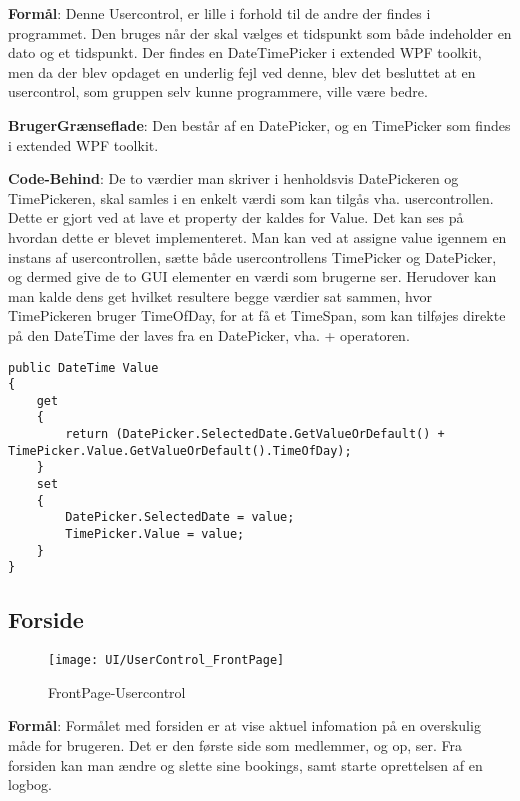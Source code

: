 \textbf{Formål}: Denne Usercontrol, er lille i forhold til de andre der findes i programmet.
Den bruges når der skal vælges et tidspunkt som både indeholder en dato og et tidspunkt. 
Der findes en DateTimePicker i extended WPF toolkit, men da der blev opdaget en underlig fejl ved denne, blev det besluttet at en usercontrol, som gruppen selv kunne programmere, ville være bedre. 

\textbf{BrugerGrænseflade}: Den består af en DatePicker, og en TimePicker som findes i extended WPF toolkit.

\textbf{Code-Behind}: De to værdier man skriver i henholdsvis DatePickeren og TimePickeren, skal samles i en enkelt værdi som kan tilgås vha. usercontrollen. 
Dette er gjort ved at lave et property der kaldes for Value. 
Det kan ses på  hvordan dette er blevet implementeret.
Man kan ved at assigne value igennem en instans af usercontrollen, sætte både usercontrollens TimePicker og DatePicker, og dermed give de to GUI elementer en værdi som brugerne ser.
Herudover kan man kalde dens get hvilket resultere begge værdier sat sammen, hvor TimePickeren bruger TimeOfDay, for at få et TimeSpan, som kan tilføjes direkte på den DateTime der laves fra en DatePicker, vha. + operatoren.

\begin{lstlisting}[frame=single, caption=DateTimePicker Value, label=DateTimePickerValue]
public DateTime Value
{
    get
    {
        return (DatePicker.SelectedDate.GetValueOrDefault() + TimePicker.Value.GetValueOrDefault().TimeOfDay);
    }
    set
    {
        DatePicker.SelectedDate = value;
        TimePicker.Value = value;
    }
}
\end{lstlisting}

\subsection{Forside}
\begin{figure}
    \label{img:frontpage}
    \vspace{-10pt}
    \begin{center}
        \texttt{[image: UI/UserControl\_FrontPage]}
    \end{center}
    \vspace{-15pt}
    \caption{FrontPage-Usercontrol}
\end{figure}

\textbf{Formål}: 
Formålet med forsiden er at vise aktuel infomation på en overskulig måde for brugeren.
Det er den første side som medlemmer, og op, ser.
Fra forsiden kan man ændre og slette sine bookings, samt starte oprettelsen af en logbog.

